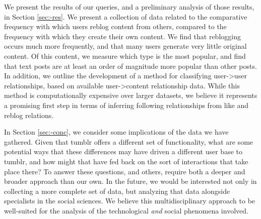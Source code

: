 We present the results of our queries, and a preliminary analysis of 
those results, in Section \ref{sec:-res}.  We present a collection of 
data related to the comparative frequency with which users reblog 
content from others, compared to the frequency with which they create 
their own content.  We find that reblogging occurs much more frequently, 
and that many users generate very little original content.  Of this 
content, we measure which type is the most popular, and find that text 
posts are at least an order of magnitude more popular than other posts.  
In addition, we outline the development of a method for classifying 
user->user relationships, based on available user->content relationship 
data.  While this method is computationally expensive over larger 
datasets, we believe it represents a promising first step in terms of 
inferring following relationships from like and reblog relations.


In Section \ref{sec:-conc}, we consider some implications of the data 
we have gathered.  Given that tumblr offers a different set of 
functionality, what are some potential ways that these differences may 
have driven a different user base to tumblr, and how might that have 
fed back on the sort of interactions that take place there?  To 
answer these questions, and others, require both a deeper and broader 
approach than our own.  In the future, we would be interested not only 
in collecting a more complete set of data, but analyzing that data 
alongside specialists in the social sciences.  We believe this 
multidisciplinary approach to be well-suited for the analysis of the 
technological \textit{and} social phenomena involved.







